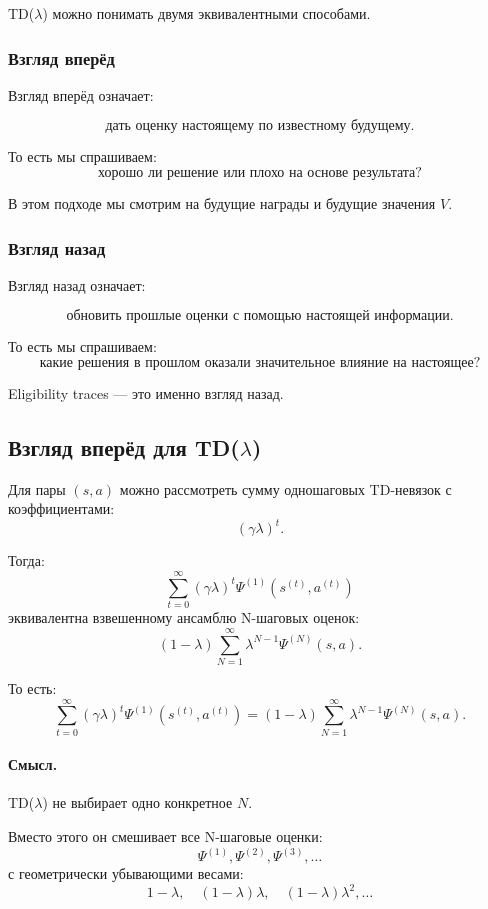 \documentclass[12pt,a4paper]{article}
\begin{document}
TD($\lambda$) можно понимать двумя эквивалентными способами.

\subsubsection{Взгляд вперёд}

Взгляд вперёд означает:

\[
\text{дать оценку настоящему по известному будущему}.
\]

То есть мы спрашиваем:
\[
\text{хорошо ли решение или плохо на основе результата?}
\]

В этом подходе мы смотрим на будущие награды и будущие значения $V$.

\subsubsection{Взгляд назад}

Взгляд назад означает:

\[
\text{обновить прошлые оценки с помощью настоящей информации}.
\]

То есть мы спрашиваем:
\[
\text{какие решения в прошлом оказали значительное влияние на настоящее?}
\]

Eligibility traces --- это именно взгляд назад.

\subsection{Взгляд вперёд для TD($\lambda$)}

Для пары $(s,a)$ можно рассмотреть сумму одношаговых TD-невязок с коэффициентами:
\[
(\gamma\lambda)^t.
\]

Тогда:
\[
\sum_{t=0}^{\infty}
(\gamma\lambda)^t
\Psi^{(1)}(s^{(t)},a^{(t)})
\]
эквивалентна взвешенному ансамблю N-шаговых оценок:
\[
(1-\lambda)
\sum_{N=1}^{\infty}
\lambda^{N-1}
\Psi^{(N)}(s,a).
\]

То есть:
\[
\sum_{t=0}^{\infty}
(\gamma\lambda)^t
\Psi^{(1)}(s^{(t)},a^{(t)})
=
(1-\lambda)
\sum_{N=1}^{\infty}
\lambda^{N-1}
\Psi^{(N)}(s,a).
\]

\paragraph{Смысл.}

TD($\lambda$) не выбирает одно конкретное $N$.

Вместо этого он смешивает все N-шаговые оценки:
\[
\Psi^{(1)},\Psi^{(2)},\Psi^{(3)},\ldots
\]
с геометрически убывающими весами:
\[
1-\lambda,\quad
(1-\lambda)\lambda,\quad
(1-\lambda)\lambda^2,\ldots
\]
\end{document}
